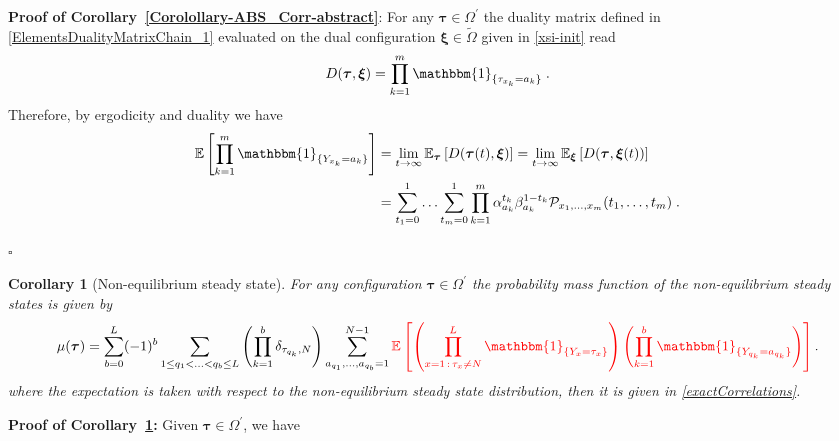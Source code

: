 \documentclass[10pt]{article}
\numberwithin{equation}{section}
\numberwithin{equation}{subsection}
\newtheorem{corollary}{Corollary}
\newcommand{\dt}{\;.}
\begin{document}
\textbf{Proof of Corollary~\ref{Corolollary-ABS_Corr-abstract}}:
For any $\bm{\tau}\in \Omega^{'}$ the duality matrix defined in \eqref{ElementsDualityMatrixChain_1} evaluated on the dual configuration $\bm{\xi}\in\widetilde{\Omega}$ given in \eqref{xsi-init} read
\begin{equation}
	D(\bm{\tau},\bm{\xi})%
	=\prod_{k=1}^{m}\mathbbm{1}_{\{\tau_{x_{k}}=a_{k}\}}\dt
\end{equation}
Therefore, by ergodicity and duality  we have 
\begin{equation}\label{CorrelationByABS-prob}
	\begin{split}
\mathbb{E}\left[\prod_{k=1}^{m}\mathbbm{1}_{\{Y_{x_{k}}=a_{k}\}}\right]&=\lim_{t\to \infty}\mathbb{E}_{\bm{\tau}}\left[D(\bm{\tau}(t),\bm{{\xi}})\right]=\lim_{t\to \infty}\mathbb{E}_{\bm{\xi}}\left[D(\bm{\tau},\bm{{\xi}}(t))\right]
	\\&=\sum_{t_{1}=0}^{1}\ldots \sum_{t_{m}=0}^{1}\prod_{k=1}^{m}\alpha_{a_{k}}^{t_{k}}\beta_{a_{k}}^{1-t_{k}}\mathcal{P}_{x_{1},\ldots,x_{m}}(t_{1},\ldots,t_{m})\dt
\end{split}
\end{equation} 
\begin{flushright}
	$\square$
\end{flushright} 
    \begin{corollary}[Non-equilibrium steady state]\label{Corollary-NESS-ABS}
For any configuration $\bm{\tau}\in \Omega^{'}$  the probability mass function of the non-equilibrium steady states is given by 
\begin{equation}\label{implicit-mass-function}
	\mu(\bm{\tau})=\sum_{b=0}^{L}(-1)^{b}\sum_{1\leq q_{1}<\ldots<q_{b}\leq L}\left(\prod_{k=1}^{b}\delta_{\tau_{q_{k}},N}\right)\sum_{a_{q_{1}},\ldots,a_{q_{b}}=1}^{N-1}{\color{red}
	\mathbb{E}\left[\left( \prod_{x=1\,:\,\tau_{x}\neq N}^{L}\mathbbm{1}_{\{Y_{x}=\tau_{x}\}}\right) \left(\prod_{k=1}^{b}\mathbbm{1}_{\{Y_{q_{k}}=a_{q_{k}}\}}\right)\right]}\,.
\end{equation}
{\color{blue}where the expectation is taken with respect to the non-equilibrium steady state distribution, then it is given in \eqref{exactCorrelations}.}
\end{corollary}
\textbf{Proof of Corollary~\ref{Corollary-NESS-ABS}:}
Given $\bm{\tau}\in \Omega^{'}$,  we have 
\end{document}

